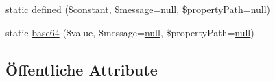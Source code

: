 \begin{DoxyCompactItemize}
\item 
static \mbox{\hyperlink{class_assert_1_1_assertion_adf4b38bccfee3c17fca0958954602a2f}{defined}} (\$constant, \$message=\mbox{\hyperlink{class_assert_1_1_assertion_af95d8b1582dd619cc0159041bc6892c5}{null}}, \$property\+Path=\mbox{\hyperlink{class_assert_1_1_assertion_af95d8b1582dd619cc0159041bc6892c5}{null}})
\item 
static \mbox{\hyperlink{class_assert_1_1_assertion_afe1753ddcafdf02e8d034613467587cc}{base64}} (\$value, \$message=\mbox{\hyperlink{class_assert_1_1_assertion_af95d8b1582dd619cc0159041bc6892c5}{null}}, \$property\+Path=\mbox{\hyperlink{class_assert_1_1_assertion_af95d8b1582dd619cc0159041bc6892c5}{null}})
\end{DoxyCompactItemize}
\subsection*{Öffentliche Attribute}
